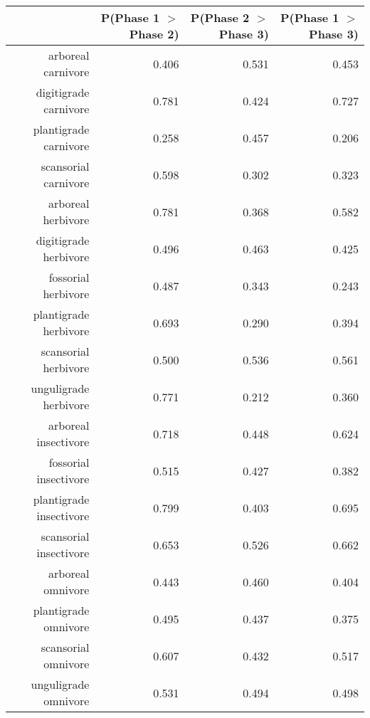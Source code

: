 \begin{table}[ht]
\centering
\begin{tabular}{rrrr}
  \hline
 & P(Phase 1 $>$ Phase 2) & P(Phase 2 $>$ Phase 3) & P(Phase 1 $>$ Phase 3) \\ 
  \hline
arboreal carnivore & 0.406 & 0.531 & 0.453 \\ 
  digitigrade carnivore & 0.781 & 0.424 & 0.727 \\ 
  plantigrade carnivore & 0.258 & 0.457 & 0.206 \\ 
  scansorial carnivore & 0.598 & 0.302 & 0.323 \\ 
  arboreal herbivore & 0.781 & 0.368 & 0.582 \\ 
  digitigrade herbivore & 0.496 & 0.463 & 0.425 \\ 
  fossorial herbivore & 0.487 & 0.343 & 0.243 \\ 
  plantigrade herbivore & 0.693 & 0.290 & 0.394 \\ 
  scansorial herbivore & 0.500 & 0.536 & 0.561 \\ 
  unguligrade herbivore & 0.771 & 0.212 & 0.360 \\ 
  arboreal insectivore & 0.718 & 0.448 & 0.624 \\ 
  fossorial insectivore & 0.515 & 0.427 & 0.382 \\ 
  plantigrade insectivore & 0.799 & 0.403 & 0.695 \\ 
  scansorial insectivore & 0.653 & 0.526 & 0.662 \\ 
  arboreal omnivore & 0.443 & 0.460 & 0.404 \\ 
  plantigrade omnivore & 0.495 & 0.437 & 0.375 \\ 
  scansorial omnivore & 0.607 & 0.432 & 0.517 \\ 
  unguligrade omnivore & 0.531 & 0.494 & 0.498 \\ 
   \hline
\end{tabular}
\label{tab:surv_plant}
\end{table}
